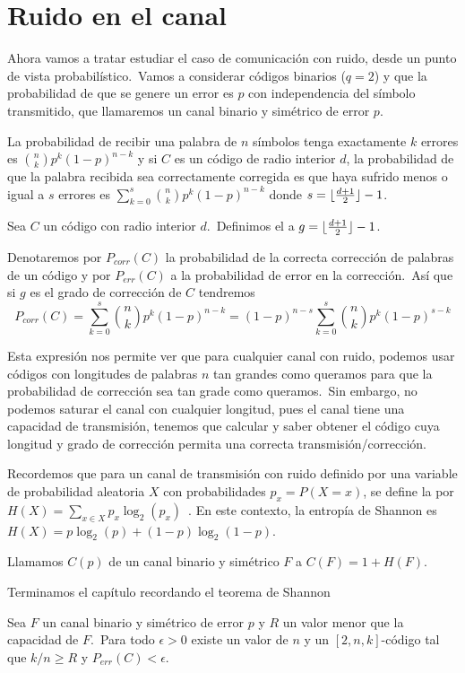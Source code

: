 \section{Ruido en el canal}
Ahora vamos a tratar estudiar el caso de comunicación con ruido, desde un punto de vista probabilístico.\ Vamos a considerar códigos binarios ($q=2$) y que la probabilidad de que se genere un error es $p$ con independencia del símbolo transmitido, que llamaremos un canal binario y simétrico de error $p$.

La probabilidad de recibir una palabra de $n$ símbolos tenga exactamente $k$ errores es $\binom{n}{k}p^k(1-p)^{n-k}$ y si $C$ es un código de radio interior $d$, la probabilidad de que la palabra recibida sea correctamente corregida es que haya sufrido menos o igual a $s$ errores es $\sum_{k=0}^s \binom{n}{k} p^k(1-p)^{n-k}$ donde $s=\lfloor \frac{d+1}{2} \rfloor-1$.

\begin{definition}
	Sea $C$ un código con radio interior $d$.\ Definimos el  a $g=\lfloor \frac{d+1}{2} \rfloor-1$.
\end{definition}

Denotaremos por $P_{corr}(C)$ la probabilidad de la correcta corrección de palabras de un código y por $P_{err}(C)$ a la probabilidad de error en la corrección.\ Así que si $g$ es el grado de corrección de $C$ tendremos
\[
	P_{corr}(C) = \sum_{k=0}^s \binom{n}{k} p^k(1-p)^{n-k}=(1-p)^{n-s}\sum_{k=0}^s \binom{n}{k} p^k(1-p)^{s-k}
\]

Esta expresión nos permite ver que para cualquier canal con ruido, podemos usar códigos con longitudes de palabras $n$ tan grandes como queramos para que la probabilidad de corrección sea tan grade como queramos.\ Sin embargo, no podemos saturar el canal con cualquier longitud, pues el canal tiene una capacidad de transmisión, tenemos que calcular y saber obtener el código cuya longitud y grado de corrección permita una correcta transmisión/corrección.

Recordemos que para un canal de transmisión con ruido definido por una variable de probabilidad aleatoria $X$ con probabilidades $p_x=P(X=x)$, se define la  por $H(X)=\sum_{x\in X}p_x \log_2(p_x)$~\cite{shannon}.
En este contexto, la entropía de Shannon es $H(X)=p \log_2(p) + (1-p) \log_2(1-p)$.

\begin{definition}
	Llamamos  $C(p)$ de un canal binario y simétrico $F$ a $C(F)=1+H(F)$.
\end{definition}

Terminamos el capítulo recordando el teorema de Shannon
\begin{lemma}
	Sea $F$ un canal binario y simétrico de error $p$ y $R$ un valor menor que la capacidad de $F$.\ Para todo $\epsilon>0$ existe un valor de $n$ y un $[2, n, k]$-código tal que $k/n\geq R$ y $P_{err}(C)<\epsilon$.
\end{lemma}
